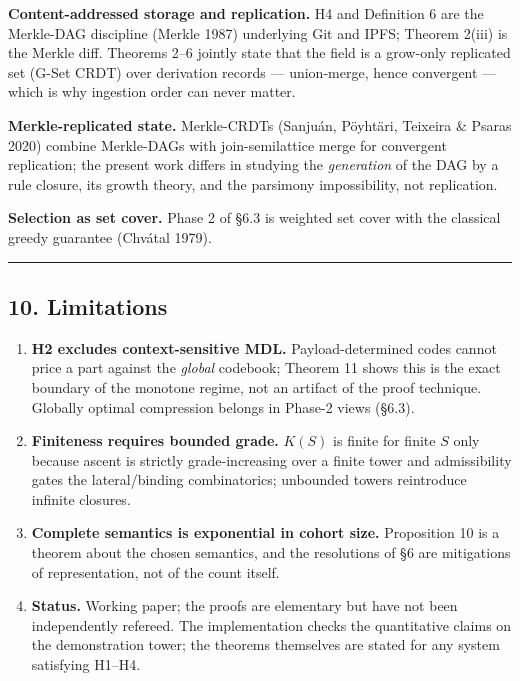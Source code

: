 \documentclass[
  10pt,
]{article}
\providecommand{\tightlist}{%
  \setlength{\itemsep}{0pt}\setlength{\parskip}{0pt}}
\begin{document}
\textbf{Content-addressed storage and replication.} H4 and Definition 6
are the Merkle-DAG discipline (Merkle 1987) underlying Git and IPFS;
Theorem 2(iii) is the Merkle diff. Theorems 2--6 jointly state that the
field is a grow-only replicated set (G-Set CRDT) over derivation records
--- union-merge, hence convergent --- which is why ingestion order can
never matter.

\textbf{Merkle-replicated state.} Merkle-CRDTs (Sanjuán, Pöyhtäri,
Teixeira \& Psaras 2020) combine Merkle-DAGs with join-semilattice merge
for convergent replication; the present work differs in studying the
\emph{generation} of the DAG by a rule closure, its growth theory, and
the parsimony impossibility, not replication.

\textbf{Selection as set cover.} Phase 2 of §6.3 is weighted set cover
with the classical greedy guarantee (Chvátal 1979).

\begin{center}\rule{0.5\linewidth}{0.5pt}\end{center}

\hypertarget{limitations}{%
\subsection{10. Limitations}\label{limitations}}

\begin{enumerate}
\def\labelenumi{\arabic{enumi}.}
\tightlist
\item
  \textbf{H2 excludes context-sensitive MDL.} Payload-determined codes
  cannot price a part against the \emph{global} codebook; Theorem 11
  shows this is the exact boundary of the monotone regime, not an
  artifact of the proof technique. Globally optimal compression belongs
  in Phase-2 views (§6.3).
\item
  \textbf{Finiteness requires bounded grade.} \(K(S)\) is finite for
  finite \(S\) only because ascent is strictly grade-increasing over a
  finite tower and admissibility gates the lateral/binding
  combinatorics; unbounded towers reintroduce infinite closures.
\item
  \textbf{Complete semantics is exponential in cohort size.} Proposition
  10 is a theorem about the chosen semantics, and the resolutions of §6
  are mitigations of representation, not of the count itself.
\item
  \textbf{Status.} Working paper; the proofs are elementary but have not
  been independently refereed. The implementation checks the
  quantitative claims on the demonstration tower; the theorems
  themselves are stated for any system satisfying H1--H4.
\end{enumerate}
\end{document}
